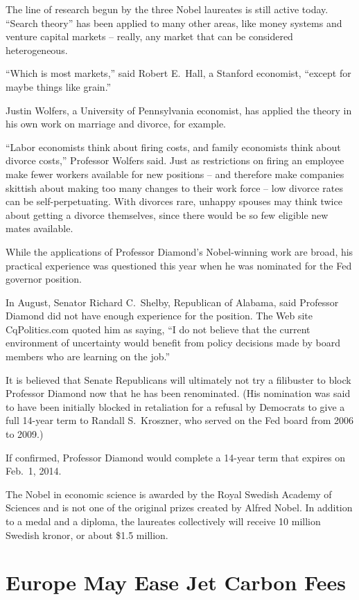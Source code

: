 ﻿\documentclass[12pt]{article}
\begin{document}
The line of research begun by the three Nobel laureates is still active today. ``Search theory'' has
been applied to many other areas, like money systems and venture capital markets -- really, any
market that can be considered heterogeneous.

``Which is most markets,'' said Robert E.~Hall, a Stanford economist, ``except for maybe things like
grain.''

Justin Wolfers, a University of Pennsylvania economist, has applied the theory in his own work on
marriage and divorce, for example.

``Labor economists think about firing costs, and family economists think about divorce costs,''
Professor Wolfers said. Just as restrictions on firing an employee make fewer workers available for
new positions -- and therefore make companies skittish about making too many changes to their work
force -- low divorce rates can be self-perpetuating. With divorces rare, unhappy spouses may think
twice about getting a divorce themselves, since there would be so few eligible new mates available.

While the applications of Professor Diamond's Nobel-winning work are broad, his practical experience
was questioned this year when he was nominated for the Fed governor position.

In August, Senator Richard C.~Shelby, Republican of Alabama, said Professor Diamond did not have
enough experience for the position. The Web site CqPolitics.com quoted him as saying, ``I do not
believe that the current environment of uncertainty would benefit from policy decisions made by
board members who are learning on the job.''

It is believed that Senate Republicans will ultimately not try a filibuster to block Professor
Diamond now that he has been renominated. (His nomination was said to have been initially blocked in
retaliation for a refusal by Democrats to give a full 14-year term to Randall S.~Kroszner, who
served on the Fed board from 2006 to 2009.)

If confirmed, Professor Diamond would complete a 14-year term that expires on Feb.~1, 2014.

The Nobel in economic science is awarded by the Royal Swedish Academy of Sciences and is not one of
the original prizes created by Alfred Nobel. In addition to a medal and a diploma, the laureates
collectively will receive 10 million Swedish kronor, or about \$1.5 million.

\section{Europe May Ease Jet Carbon Fees}
\end{document}
